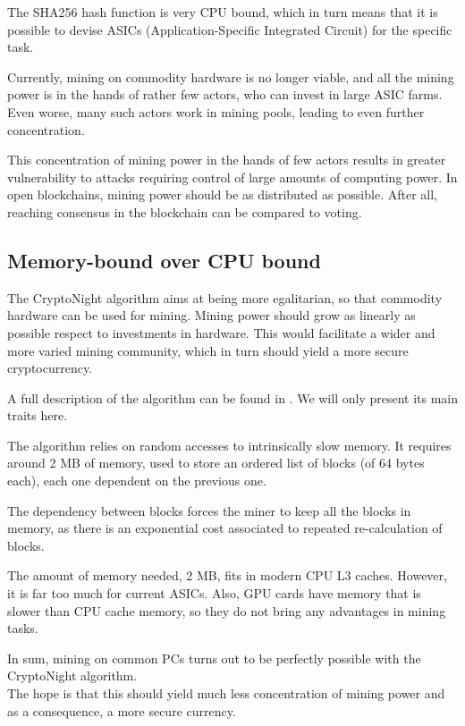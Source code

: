 The SHA256 hash function is very CPU bound, which in turn means that it is possible to devise
ASICs (Application-Specific Integrated Circuit) for the specific task.

Currently, mining on commodity hardware is no longer viable, and all the mining power is
in the hands of rather few actors, who can invest in large ASIC farms. Even worse, many such
actors work in mining pools, leading to even further concentration.

This concentration of mining power in the hands of few actors results in greater
vulnerability to attacks requiring control of large amounts of computing power.
In open blockchains, mining power should be as distributed as possible. After all,
reaching consensus in the blockchain can be compared to voting.


\subsection{Memory-bound over CPU bound}

The CryptoNight algorithm aims at being more egalitarian, so that commodity hardware can be used
for mining. Mining power should grow as linearly as possible respect to investments in hardware.
This would facilitate a wider and more varied mining community, which in turn should yield a more secure
cryptocurrency.

A full description of the algorithm can be found in \cite{CryptoNight}. We will only present its main traits here.

The algorithm relies on random accesses to intrinsically slow memory. It requires around 2 MB of memory, used to store
an ordered list of blocks (of 64 bytes each), each one dependent on the previous one.

The dependency between blocks forces the miner to keep all the blocks in memory, as there is an exponential cost associated to repeated re-calculation of blocks.

The amount of memory needed, 2 MB, fits in modern CPU L3 caches. However, it is far too much for current ASICs. Also, GPU cards
have memory that is slower than CPU cache memory, so they do not bring any advantages in mining tasks.

In sum, mining on common PCs turns out to be perfectly possible with the CryptoNight algorithm.
\\

The hope is that this should yield much less concentration of mining power and as a consequence, a more secure currency.









 


